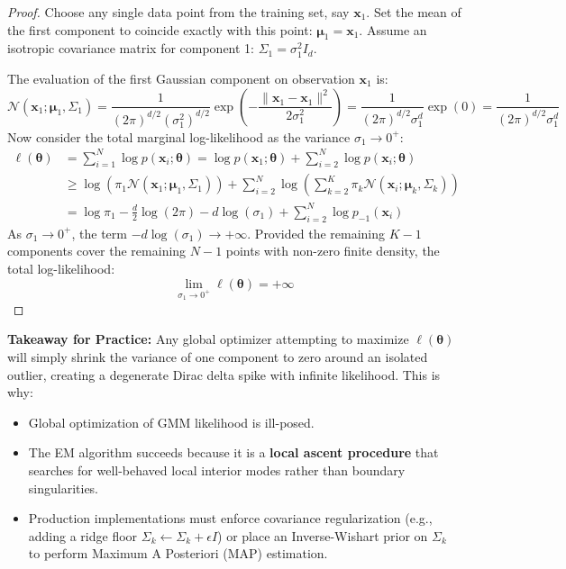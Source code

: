 \begin{proof}
Choose any single data point from the training set, say $\mathbf{x}_1$. Set the mean of the first component to coincide exactly with this point: $\boldsymbol{\mu}_1 = \mathbf{x}_1$. 
Assume an isotropic covariance matrix for component 1: $\Sigma_1 = \sigma_1^2 I_d$.

The evaluation of the first Gaussian component on observation $\mathbf{x}_1$ is:
\begin{equation}
\mathcal{N}(\mathbf{x}_1; \boldsymbol{\mu}_1, \Sigma_1) = \frac{1}{(2\pi)^{d/2} (\sigma_1^2)^{d/2}} \exp\left( -\frac{\|\mathbf{x}_1 - \mathbf{x}_1\|^2}{2\sigma_1^2} \right) = \frac{1}{(2\pi)^{d/2}\sigma_1^d} \exp(0) = \frac{1}{(2\pi)^{d/2}\sigma_1^d}
\end{equation}
Now consider the total marginal log-likelihood as the variance $\sigma_1 \to 0^+$:
\begin{align}
\ell(\boldsymbol{\theta}) &= \sum_{i=1}^N \log p(\mathbf{x}_i; \boldsymbol{\theta}) = \log p(\mathbf{x}_1; \boldsymbol{\theta}) + \sum_{i=2}^N \log p(\mathbf{x}_i; \boldsymbol{\theta}) \nonumber \\
&\ge \log\left( \pi_1 \mathcal{N}(\mathbf{x}_1; \boldsymbol{\mu}_1, \Sigma_1) \right) + \sum_{i=2}^N \log\left( \sum_{k=2}^K \pi_k \mathcal{N}(\mathbf{x}_i; \boldsymbol{\mu}_k, \Sigma_k) \right) \nonumber \\
&= \log \pi_1 - \frac{d}{2}\log(2\pi) - d \log(\sigma_1) + \sum_{i=2}^N \log p_{-1}(\mathbf{x}_i)
\end{align}
As $\sigma_1 \to 0^+$, the term $-d \log(\sigma_1) \to +\infty$. Provided the remaining $K-1$ components cover the remaining $N-1$ points with non-zero finite density, the total log-likelihood:
\begin{equation}
\lim_{\sigma_1 \to 0^+} \ell(\boldsymbol{\theta}) = +\infty
\end{equation}
\end{proof}

\textbf{Takeaway for Practice:} Any global optimizer attempting to maximize $\ell(\boldsymbol{\theta})$ will simply shrink the variance of one component to zero around an isolated outlier, creating a degenerate Dirac delta spike with infinite likelihood. This is why:
\begin{itemize}
    \item Global optimization of GMM likelihood is ill-posed.
    \item The EM algorithm succeeds because it is a \textbf{local ascent procedure} that searches for well-behaved local interior modes rather than boundary singularities.
    \item Production implementations must enforce covariance regularization (e.g., adding a ridge floor $\Sigma_k \leftarrow \Sigma_k + \epsilon I$) or place an Inverse-Wishart prior on $\Sigma_k$ to perform Maximum A Posteriori (MAP) estimation.
\end{itemize}

